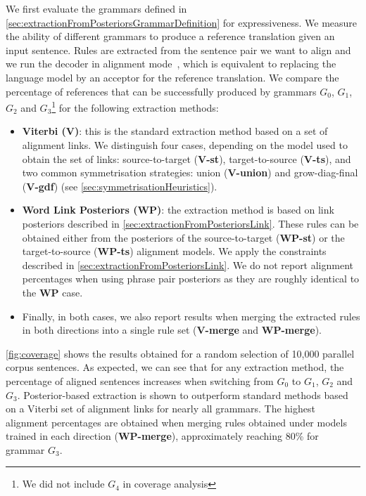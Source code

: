 We first evaluate the grammars defined in \autoref{sec:extractionFromPosteriorsGrammarDefinition} for expressiveness.
We measure
the ability of different grammars to produce a reference translation given an
input sentence. Rules are extracted from the sentence pair we want to align and
we run the decoder in alignment
mode~\citep{degispert-iglesias-blackwood-banga-byrne:2010:CL}, which is
equivalent to replacing the language model by an acceptor for the reference
translation. We compare the percentage of references that can be successfully
produced by grammars $G_0$, $G_1$, $G_2$ and
$G_3$\footnote{We did not include $G_4$ in coverage analysis} for the following
extraction methods:
%
\begin{itemize}
  \item \textbf{Viterbi (V)}: this is the standard extraction method based on a set
of alignment links. We distinguish four cases, depending on the model used to
obtain the set of links: source-to-target ({\bf V-st}), target-to-source
({\bf V-ts}), and two common symmetrisation strategies: union ({\bf V-union})
and grow-diag-final ({\bf V-gdf}) (see \autoref{sec:symmetrisationHeuristics}).
  \item \textbf{Word Link Posteriors (WP)}: the extraction method is based on link
posteriors described in \autoref{sec:extractionFromPosteriorsLink}. These
rules can be obtained either from the posteriors of the source-to-target
({\bf WP-st}) or the target-to-source ({\bf WP-ts}) alignment models. We apply
the constraints described in \autoref{sec:extractionFromPosteriorsLink}. We
do not report alignment percentages when using phrase pair posteriors as they
are roughly identical to the {\bf WP} case.
  \item Finally, in both cases, we also report results when merging the
extracted rules in both directions into a single rule set ({\bf V-merge} and
{\bf WP-merge}).
\end{itemize}
%
\autoref{fig:coverage} shows the results obtained for a random selection of
10,000 parallel corpus sentences. As expected, we can see that for any
extraction method, the percentage of aligned sentences increases when switching
from $G_0$ to $G_1$, $G_2$ and $G_3$. Posterior-based extraction is shown to
outperform standard methods based on a Viterbi set of alignment links for nearly
all grammars. The highest alignment percentages are obtained when merging rules
obtained under models trained in each direction ({\bf WP-merge}), approximately
reaching 80\% for grammar $G_3$.

